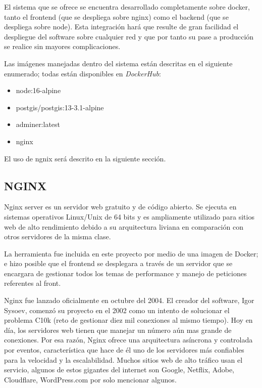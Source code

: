 El sistema que se ofrece se encuentra desarrollado completamente sobre docker, tanto el frontend (que se despliega sobre nginx) como el backend (que se despliega sobre node). Esta integración hará que resulte de gran facilidad el despliegue del software sobre cualquier red y que por tanto su pase a producción se realice sin mayores complicaciones. 

Las imágenes manejadas dentro del sistema están descritas en el siguiente enumerado; todas están disponibles en \textit{DockerHub}:
\begin{itemize}
	\item node:16-alpine
	\item postgis/postgis:13-3.1-alpine
	\item adminer:latest
	\item nginx
\end{itemize}

El uso de ngnix será descrito en la siguiente sección.

\subsection{NGINX}

Nginx server es un servidor web gratuito y de código abierto. Se ejecuta en sistemas operativos Linux/Unix de 64 bits y es ampliamente utilizado para sitios web de alto rendimiento debido a su arquitectura liviana en comparación con otros servidores de la misma clase.

La herramienta fue incluida en este proyecto por medio de una imagen de Docker; e hizo posible que el frontend se desplegara a través de un servidor que se encargara de gestionar todos los temas de performance y manejo de peticiones referentes al front.

Nginx fue lanzado oficialmente en octubre del 2004. El creador del software, Igor Sysoev, comenzó su proyecto en el 2002 como un intento de solucionar el problema C10k (reto de gestionar diez mil conexiones al mismo tiempo). Hoy en día, los servidores web tienen que manejar un número aún mas grande de conexiones. Por esa razón, Nginx ofrece una arquitectura asíncrona y controlada por eventos, característica que hace de él uno de los servidores más confiables para la velocidad y la escalabilidad. Muchos sitios web de alto tráfico usan el servicio, algunos de estos gigantes del internet son Google, Netflix, Adobe, Cloudflare, WordPress.com por solo mencionar algunos. \cite{nginx}





